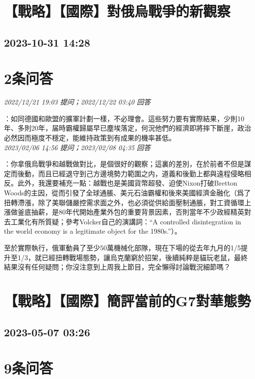 \documentclass[twocolumn]{ctexart}
\begin{document}
\section{【戰略】【國際】對俄烏戰爭的新觀察}
\subsection{2023-10-31 14:28}


\section{2条问答}

\textit{\hfill\noindent\small 2022/12/21 19:03 提问；2022/12/22 03:40 回答}

：如同德國和歐盟的擴軍計劃一樣，不必理會。這些努力要有實際結果，少則10年、多則20年，届時霸權歸屬早已塵埃落定，何況他們的經濟即將摔下斷崖，政治必然因而極度不穩定，能維持政策到有成果的機率甚低。
\\

\textit{\hfill\noindent\small 2023/02/06 14:56 提问；2023/02/08 04:35 回答}

：你拿俄烏戰爭和越戰做對比，是個很好的觀察；這裏的差別，在於前者不但是謀定而後動，而且已經退守到己方邊境勢力範圍之内，道義和後勤上都與遠程侵略相反。此外，我還要補充一點：越戰也是美國貨幣超發、迫使Nixon打破Bretton Woods的主因，從而引發了全球通脹、美元石油霸權和後來美國經濟金融化（爲了扭轉滯漲，除了美聯儲嚴控需求面之外，也必須從供給面壓制通脹，對工資循環上漲做釜底抽薪，是80年代開始產業外包的重要背景因素，否則當年不少政經精英對去工業化有所質疑；參考Volcker自己的演講詞：“A controlled disintegration in the world economy is a legitimate object for the 1980s.”）。

至於實際執行，俄軍動員了至少50萬機械化部隊，現在下場的從去年九月的1/5提升至1/3，就已經扭轉戰場態勢，讓烏克蘭窮於招架，後續純粹是貓玩老鼠，最終結果沒有任何疑問；你沒注意到上周我上節目，完全懶得討論戰況細節嗎？
\\


\section{【戰略】【國際】簡評當前的G7對華態勢}
\subsection{2023-05-07 03:26}


\section{9条问答}
\end{document}
